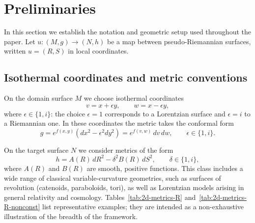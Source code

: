 \documentclass[12pt]{amsart}
\begin{document}
\section{Preliminaries}

In this section we establish the notation and geometric setup used
throughout the paper. Let $u : (M,g) \longrightarrow (N,h)$ be a
map between pseudo-Riemannian surfaces, written $u = (R,S)$ in local
coordinates.

\subsection{Isothermal coordinates and metric conventions}

On the domain surface $M$ we choose isothermal coordinates
\[
v = x + \epsilon y, \qquad w = x - \epsilon y,
\]
where $\epsilon \in \{1,i\}$: the choice $\epsilon = 1$ corresponds
to a Lorentzian surface and $\epsilon = i$ to a Riemannian one. In
these coordinates the metric takes the conformal form
\[
g = e^{f(x,y)} \left( dx^{2} - \epsilon^{2} dy^{2} \right)
= e^{f(v,w)}\, dv\,dw, \qquad \epsilon \in \{1,i\}.
\]

On the target surface $N$ we consider metrics of the form
\[
h = A(R)\, dR^{2} - \delta^{2} B(R)\, dS^{2}, \qquad \delta \in \{1,i\},
\]
where $A(R)$ and $B(R)$ are smooth, positive functions. This class
includes a wide range of classical variable-curvature geometries,
such as surfaces of revolution (catenoids, paraboloids, tori), as
well as Lorentzian models arising in general relativity and cosmology.
Tables~\ref{tab:2d-metrics-R} and~\ref{tab:2d-metrics-R-nonconst}
list representative examples; they are intended as a
non-exhaustive illustration of the breadth of the framework.
\end{document}

